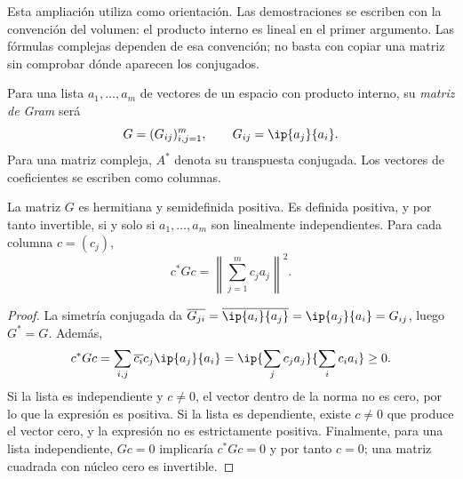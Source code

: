 Esta ampliación utiliza \cite{max-gram,max-proyeccion} como orientación. Las demostraciones se escriben con la convención del volumen: el producto interno es lineal en el primer argumento. Las fórmulas complejas dependen de esa convención; no basta con copiar una matriz sin comprobar dónde aparecen los conjugados.

\begin{definicion}
Para una lista $a_1,\ldots,a_m$ de vectores de un espacio con producto interno, su \emph{matriz de Gram} será
\[
 G=(G_{ij})_{i,j=1}^m,\qquad G_{ij}=\ip{a_j}{a_i}.
\]
Para una matriz compleja, $A^*$ denota su transpuesta conjugada. Los vectores de coeficientes se escriben como columnas.
\end{definicion}

\begin{proposicion}\label{ampl:gram-positiva}
La matriz $G$ es hermitiana y semidefinida positiva. Es definida positiva, y por tanto invertible, si y solo si $a_1,\ldots,a_m$ son linealmente independientes. Para cada columna $c=(c_j)$,
\[
 c^*Gc=\left\|\sum_{j=1}^mc_ja_j\right\|^2.
\]
\end{proposicion}
\begin{proof}
La simetría conjugada da $\overline{G_{ji}}=\overline{\ip{a_i}{a_j}}=\ip{a_j}{a_i}=G_{ij}$, luego $G^*=G$. Además,
\[
 c^*Gc=\sum_{i,j}\overline{c_i}c_j\ip{a_j}{a_i}
 =\ip{\sum_jc_ja_j}{\sum_ic_ia_i}\ge0.
\]
Si la lista es independiente y $c\ne0$, el vector dentro de la norma no es cero, por lo que la expresión es positiva. Si la lista es dependiente, existe $c\ne0$ que produce el vector cero, y la expresión no es estrictamente positiva. Finalmente, para una lista independiente, $Gc=0$ implicaría $c^*Gc=0$ y por tanto $c=0$; una matriz cuadrada con núcleo cero es invertible.
\end{proof}

